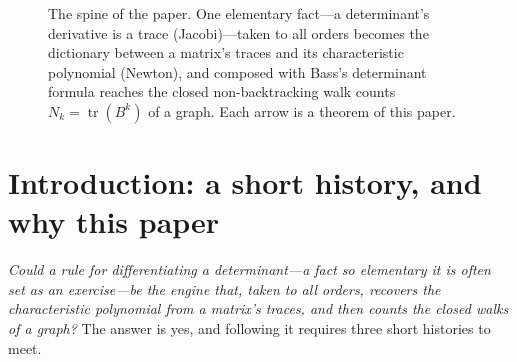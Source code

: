 \documentclass[11pt]{article}
\newcommand{\tr}{\operatorname{tr}}
\newcommand{\adj}{\operatorname{adj}}
\DeclareMathOperator{\charpolyRev}{charpolyRev}
\begin{document}
\begin{figure}[h]
\centering
{}
\caption{The spine of the paper. One elementary fact---a determinant's derivative is a
trace (Jacobi)---taken to all orders becomes the dictionary between a matrix's traces and its
characteristic polynomial (Newton), and composed with Bass's determinant formula reaches the closed
non-backtracking walk counts $N_k=\tr(B^k)$ of a graph. Each arrow is a theorem of this paper.}
\label{fig:spine}
\end{figure}

\section{Introduction: a short history, and why this paper}
\label{sec:intro}

\emph{Could a rule for differentiating a determinant---a fact so elementary it is often set as an
exercise---be the engine that, taken to all orders, recovers the characteristic polynomial from a
matrix's traces, and then counts the closed walks of a graph?} The answer is yes, and following it
requires three short histories to meet.
\end{document}
